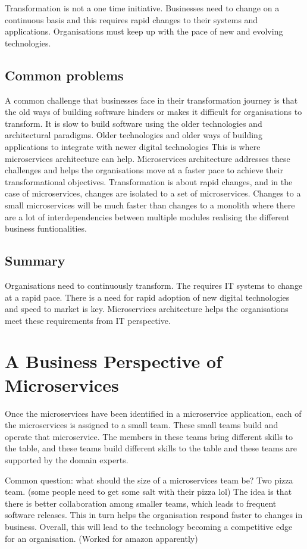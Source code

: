 Transformation is not a one time initiative.
Businesses need to change on a continuous basis and this requires rapid changes to their systems and applications.
Organisations must keep up with the pace of new and evolving technologies.

\subsection{Common problems}
A common challenge that businesses face in their transformation journey is that the old ways of building software hinders or makes it difficult for organisations to transform.
It is slow to build software using the older technologies and architectural paradigms.
Older technologies and older ways of building applications to integrate with newer digital technologies
This is where microservices architecture can help.
Microservices architecture addresses these challenges and helps the organisations move at a faster pace to achieve their transformational objectives.
Transformation is about rapid changes, and in the case of microservices, changes are isolated to a set of microservices.
Changes to a small microservices will be much faster than changes to a monolith where there are a lot of interdependencies between multiple modules realising the different business funtionalities.

\subsection{Summary}
Organisations need to continuously transform.
The requires IT systems to change at a rapid pace.
There is a need for rapid adoption of new digital technologies and speed to market is key.
Microservices architecture helps the organisations meet these requirements from IT perspective.


\section{A Business Perspective of Microservices}

Once the microservices have been identified in a microservice application, each of the microservices is assigned to a small team.
These small teams build and operate that microservice.
The members in these teams bring different skills to the table, and these teams build different skills to the table and these teams are supported by the domain experts.

Common question: what should the size of a microservices team be? Two pizza team. (some people need to get some salt with their pizza lol)
The idea is that there is better collaboration among smaller teams, which leads to frequent software releases.
This in turn helps the organisation respond faster to changes in business.
Overall, this will lead to the technology becoming a competitive edge for an organisation. (Worked for amazon apparently)

